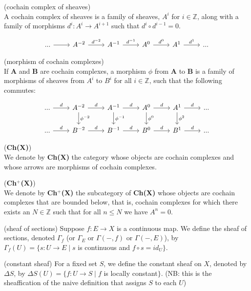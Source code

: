 \begin{definition*}
	(cochain complex of sheaves)\\ A cochain complex of sheaves is a family of sheaves, $A^i$ for $i \in \mathbb{Z}$, along with a family of morphisms $d^i: A^i \rightarrow A^{i+1}$ such that $d^i \circ d^{i-1} =0$.
	
	\[
	\begin{tikzcd}
	... \arrow[r] 
	& A^{-2} \arrow[r, "d^{-2}"] 
	& A^{-1} \arrow[r, "d^{-1}"] 
	& A^0 \arrow[r, "d^0"] 
	& A^1 \arrow[r, "d^1"] 
	& ...
	\end{tikzcd}
	\]
	
\end{definition*}

\begin{definition*}
	(morphism of cochain complexes)\\ If $\textbf{A}$ and $\textbf{B}$ are cochain complexes, a morphism $\phi$ from $\textbf{A}$ to $\textbf{B}$ is a family of morphisms of sheaves from $A^i$ to $B^i$ for all $i \in \mathbb{Z}$, such that the following commutes:
	
	\[
	\begin{tikzcd}
	... \arrow[r, "d"]
	& A^{-2} \arrow[r, "d"] \arrow[d, "\phi^{-2}"]
	& A^{-1} \arrow[r, "d"] \arrow[d, "\phi^{-1}"]
	& A^0 \arrow[r, "d"] \arrow[d, "\phi^0"]
	& A^1 \arrow[r, "d"] \arrow[d, "\phi^2"]
	& ...
	\\
	... \arrow[r,"d"]
	& B^{-2} \arrow[r,"d"]
	& B^{-1} \arrow[r,"d"]
	& B^0 \arrow[r,"d"]
	& B^1 \arrow[r,"d"]
	& ...
	\end{tikzcd}
	\]
\end{definition*}

\begin{definition*}
	(\textbf{Ch(X)})\\ We denote by \textbf{Ch(X)} the category whose objects are cochain complexes and whose arrows are morphisms of cochain complexes.
\end{definition*}

\begin{definition*}
	(\textbf{Ch$^+$(X)}) \\ We denote by \textbf{Ch$^+$(X)} the subcategory of \textbf{Ch(X)} whose objects are cochain complexes that are bounded below, that is, cochain complexes for which there exists an $N \in \mathbb{Z}$ such that for all $n \leq N$ we have $A^n = 0$.
\end{definition*}

\begin{definition*}
	(sheaf of sections) Suppose $f: E \rightarrow X$ is a continuous map. We define the sheaf of sections, denoted $\Gamma_f$ (or $\Gamma_E$ or $\Gamma(-,f)$ or $\Gamma(-,E)$), by $\Gamma_f(U) = \{s:U\rightarrow E \mid s $ is continuous and $f \circ s =id_U \}$.
\end{definition*}

\begin{definition*}
	(constant sheaf) For a fixed set $S$, we define the constant sheaf on $X$, denoted by $\Delta S$, by $\Delta S(U) = \{f:U\rightarrow S \mid f $ is locally constant$\}$. (NB: this is the sheaffication of the naive definition that assigns $S$ to each $U$)
\end{definition*}
